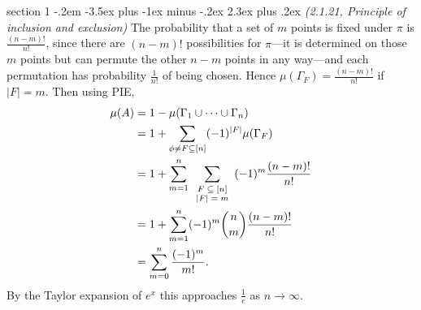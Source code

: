 \documentclass[12pt]{article}
\makeatletter
\theoremstyle{norm}
\newcommand{\rc}[1]{\frac{1}{#1}}
\newcommand{\subeq}[0]{\subseteq}
\newcommand{\Ga}[0]{\Gamma}
\newenvironment{problem}{\@startsection
       {section}
       {1}
       {-.2em}
       {-3.5ex plus -1ex minus -.2ex}
       {2.3ex plus .2ex}
       {\pagebreak[3]%
       \large\bf\noindent{Problem }
       }
       }
       {%
       }
\makeatother
\begin{document}
\begin{problem}{\it (2.1.21, Principle of inclusion and exclusion)}
The probability that a set of $m$ points is fixed under $\pi$ is $\frac{(n-m)!}{n!}$, since there are $(n-m)!$ possibilities for $\pi$---it is determined on those $m$ points but can permute the other $n-m$ points in any way---and each permutation has probability $\rc{n!}$ of being chosen. Hence $\mu(\Ga_F)=\frac{(n-m)!}{n!}$ if $|F|=m$. Then using PIE,
\begin{align*}
\mu(A)&=1-\mu(\Ga_1\cup \cdots \cup \Ga_n)\\
&=1+\sum_{\phi\neq F\subeq [n]} (-1)^{|F|} \mu(\Ga_F)\\
&=1+\sum_{m=1}^{n}\sum_{\scriptsize\begin{array}{c}F\subeq [n]\\|F|=m\end{array}}(-1)^m\frac{(n-m)!}{n!}\\
&=1+\sum_{m=1}^n (-1)^{m}\binom nm\frac{(n-m)!}{n!}\\
&=\sum_{m=0}^n \frac{(-1)^m}{m!}.
\end{align*}
By the Taylor expansion of $e^x$ this approaches $\rc e$ as $n\to \infty$.
\end{problem}
\end{document}
